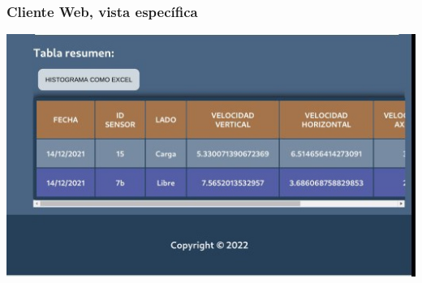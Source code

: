 \documentclass{beamer}
\begin{document}
\begin{frame}
    \begin{table}
    \frametitle{Cliente Web, vista específica}
    \includegraphics[width=0.7\linewidth]{../images/diapositivas/clients/tabla.jpg}
    \end{table}
\end{frame}
\end{document}
